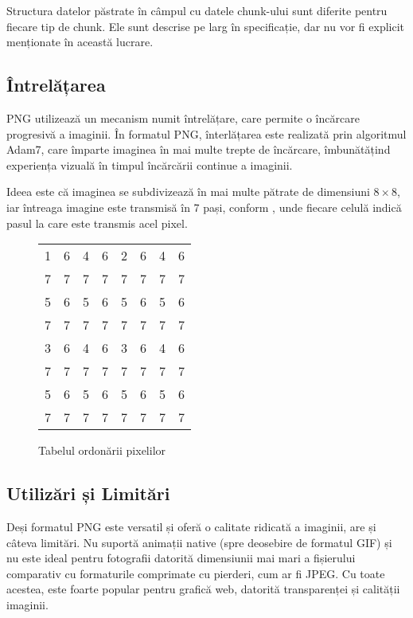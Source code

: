 \documentclass[a4paper,12pt]{report}
\begin{document}
Structura datelor păstrate în câmpul cu datele chunk-ului sunt diferite pentru fiecare tip de chunk.
Ele sunt descrise pe larg în specificație, dar nu vor fi explicit menționate în această lucrare.

\subsection{Întrelățarea}

\ac{PNG} utilizează un mecanism numit întrelățare,
care permite o încărcare progresivă a imaginii.
În formatul \ac{PNG}, înterlățarea este realizată prin algoritmul Adam7,
care împarte imaginea în mai multe trepte de încărcare,
îmbunătățind experiența vizuală în timpul încărcării continue a imaginii.

Ideea este că imaginea se subdivizează în mai multe pătrate de dimensiuni $8 \times 8$,
iar întreaga imagine este transmisă în 7 pași, conform , unde
fiecare celulă indică pasul la care este transmis acel pixel.

\begin{figure}[!ht]
\centering
\begin{tabular}{c c c c c c c c}
    1 & 6 & 4 & 6 & 2 & 6 & 4 & 6 \\
    7 & 7 & 7 & 7 & 7 & 7 & 7 & 7 \\
    5 & 6 & 5 & 6 & 5 & 6 & 5 & 6 \\
    7 & 7 & 7 & 7 & 7 & 7 & 7 & 7 \\
    3 & 6 & 4 & 6 & 3 & 6 & 4 & 6 \\
    7 & 7 & 7 & 7 & 7 & 7 & 7 & 7 \\
    5 & 6 & 5 & 6 & 5 & 6 & 5 & 6 \\
    7 & 7 & 7 & 7 & 7 & 7 & 7 & 7 \\
\end{tabular}
\caption{Tabelul ordonării pixelilor}
\label{fig:pixel_order_table}
\end{figure}

\subsection{Utilizări și Limitări}

Deși formatul \ac{PNG} este versatil și oferă o calitate ridicată a imaginii, are și câteva limitări.
Nu suportă animații native (spre deosebire de formatul \ac{GIF})
și nu este ideal pentru fotografii datorită dimensiunii mai mari a fișierului comparativ
cu formaturile comprimate cu pierderi, cum ar fi \ac{JPEG}.
Cu toate acestea, este foarte popular pentru grafică web,
datorită transparenței și calității imaginii.
\end{document}
